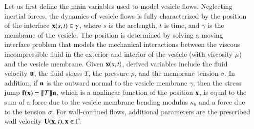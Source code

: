 Let us first define the main variables used to model vesicle flows.
Neglecting inertial forces, the dynamics of vesicle flows is fully
characterized by the position of the interface ${\mathbf{x}}(s,t) \in \gamma$,
where $s$ is the arclength, $t$ is time, and $\gamma$ is the membrane of
the vesicle. The position is determined by solving a moving interface
problem that models the mechanical interactions between the viscous
incompressible fluid in the exterior and interior of the vesicle (with
viscosity $\mu$) and the vesicle membrane.  Given ${\mathbf{x}}(s,t)$, derived
variables include the fluid velocity ${\mathbf{u}}$, the fluid stress $T$, the
pressure $p$, and the membrane tension $\sigma$.  In addition, if ${\mathbf{n}}$
is the outward normal to the vesicle membrane $\gamma$, then the stress
jump ${\mathbf{f}}({\mathbf{x}}) = \llbracket T \rrbracket \mathbf{n}$, which is a
nonlinear function of the position ${\mathbf{x}}$, is equal to the sum of a force
due to the vesicle membrane bending modulus $\kappa_b$ and a force due
to the tension $\sigma$.  For wall-confined flows, additional parameters
are the prescribed wall velocity $\mathbf{U}({\mathbf{x}},t), {\mathbf{x}} \in \Gamma$.

